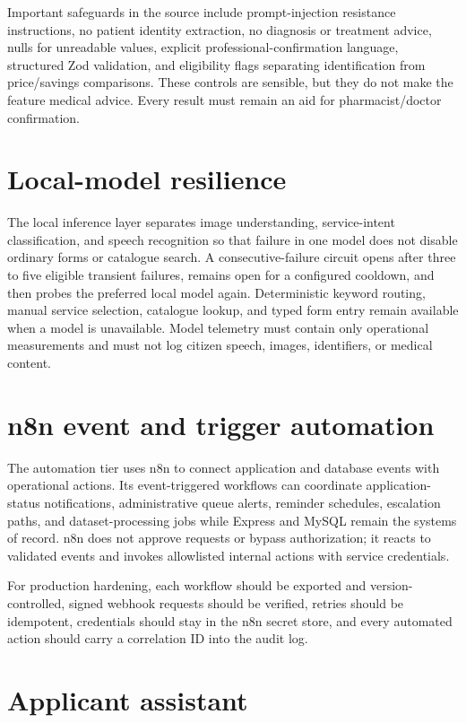 \documentclass[12pt,a4paper,oneside]{report}
\begin{document}
Important safeguards in the source include prompt-injection resistance instructions, no patient
identity extraction, no diagnosis or treatment advice, nulls for unreadable values, explicit
professional-confirmation language, structured Zod validation, and eligibility flags separating
identification from price/savings comparisons. These controls are sensible, but they do not make
the feature medical advice. Every result must remain an aid for pharmacist/doctor confirmation.

\section{Local-model resilience}

The local inference layer separates image understanding, service-intent classification, and speech
recognition so that failure in one model does not disable ordinary forms or catalogue search. A
consecutive-failure circuit opens after three to five eligible transient failures, remains open for
a configured cooldown, and then probes the preferred local model again. Deterministic keyword
routing, manual service selection, catalogue lookup, and typed form entry remain available when a
model is unavailable. Model telemetry must contain only operational measurements and must not log
citizen speech, images, identifiers, or medical content.

\section{n8n event and trigger automation}

The automation tier uses n8n to connect application and database events with operational actions.
Its event-triggered workflows can coordinate application-status notifications, administrative
queue alerts, reminder schedules, escalation paths, and dataset-processing jobs while Express and
MySQL remain the systems of record. n8n does not approve requests or bypass authorization; it
reacts to validated events and invokes allowlisted internal actions with service credentials.

For production hardening, each workflow should be exported and version-controlled, signed webhook
requests should be verified, retries should be idempotent, credentials should stay in the n8n
secret store, and every automated action should carry a correlation ID into the audit log.

\section{Applicant assistant}
\end{document}
